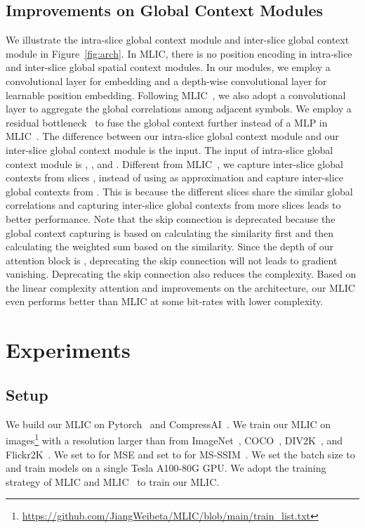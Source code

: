 \documentclass{article}
\theoremstyle{plain}
\theoremstyle{definition}
\theoremstyle{remark}
\begin{document}
  \subsection{Improvements on Global Context Modules}
  We illustrate the intra-slice global context module and 
  inter-slice global context module in Figure~\ref{fig:arch}.
  In MLIC, there is no position encoding in intra-slice and inter-slice global spatial
  context modules.
  In our modules, we employ a  convolutional layer for embedding and a 
  depth-wise convolutional layer for learnable position embedding.
  Following MLIC~\cite{jiang2022mlic}, we also adopt a 
  convolutional layer to aggregate the global correlations among adjacent symbols.
  We employ a residual bottleneck~\cite{jiang2023slic} to fuse the global context further instead of a MLP in MLIC~\cite{jiang2022mlic}.
  The difference between our intra-slice global context module and
  our inter-slice global context module is the input.
  The input of intra-slice global context module is ,
  , and . 
  Different from MLIC~\cite{jiang2022mlic}, we capture inter-slice global contexts from slices
  , instead of using  as
  approximation and capture inter-slice global contexts from .
  This is because the different slices share the similar global correlations
  and capturing inter-slice global contexts from more slices leads to better performance.
  Note that the skip connection is deprecated because the global context capturing
  is based on calculating the similarity first and then calculating the weighted sum based on the similarity.
  Since the depth of our attention block is , deprecating the skip connection
  will not leads to gradient vanishing. Deprecating the skip connection also reduces the complexity.
  Based on the linear complexity attention and improvements on the architecture,
  our MLIC even performs better than MLIC at some bit-rates with lower complexity.
  \section{Experiments}
  \label{sec:exp}
  \subsection{Setup}
  \label{sec:exp:setup}
  We build our MLIC on Pytorch~\cite{paszke2019pytorch} and 
  CompressAI~\cite{begaint2020compressai}.
  We train our MLIC on  images\footnote[1]{\url{https://github.com/JiangWeibeta/MLIC/blob/main/train_list.txt}} with a 
  resolution larger than 
  from ImageNet~\cite{deng2009imagenet},
  COCO~\cite{lin2014microsoft}, DIV2K~\cite{Agustsson2017NTIRE2C}, and Flickr2K~\cite{lim2017enhanced}.
  We set  to  for MSE
  and set  to  for MS-SSIM~\cite{wang2003multiscale}.
  We set the batch size to  and train models on a single Tesla A100-80G GPU.
  We adopt the training strategy of MLIC and MLIC~\cite{jiang2022mlic} to train our MLIC.
\end{document}
